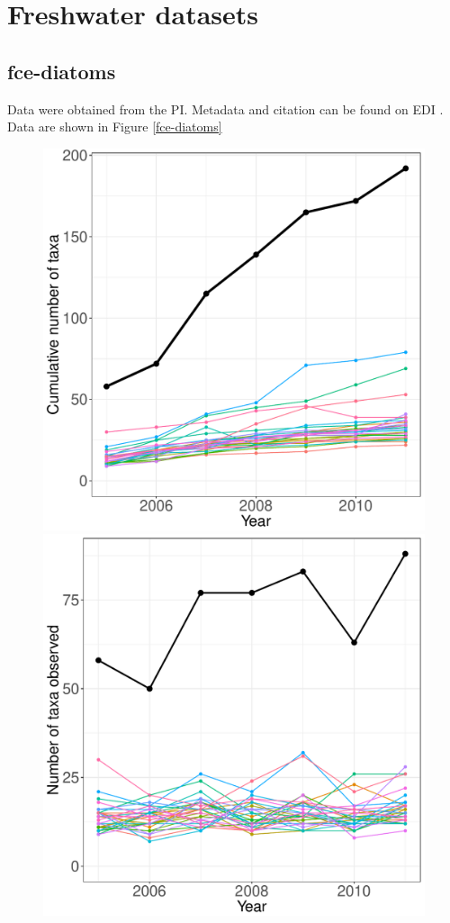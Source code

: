 \documentclass[11pt, oneside]{article}
\begin{document}
\section {Freshwater datasets}

\subsection {fce-diatoms}
Data were obtained from the PI.
Metadata and citation can be found on EDI \citep{fce-diatoms}.
Data are shown in Figure \ref{fce-diatoms}
\begin{figure}[h!]
\centering
\includegraphics[scale = 0.4]{fce-diatoms-catano_species_accumulation_curve.pdf}
\includegraphics[scale = 0.4]{fce-diatoms-catano_num_taxa_over_time.pdf}

\end{figure}
\end{document}
